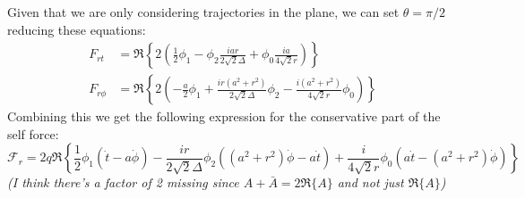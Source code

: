 \documentclass[preprint,showpacs,preprintnumbers,amssymb,superscriptaddress,aps,prd,nofootinbib,11pt]{revtex4-1}
\begin{document}
Given that we are only considering trajectories in the plane, we can set $\theta = \pi/2$ reducing these equations:
\begin{align}
    F_{rt} &=\Re \left\{ 2 \left( \frac{1}{2}\phi_1 - \phi_2  \frac{i a r}{2 \sqrt{2} \Delta} + \phi_0\frac{i a}{4 \sqrt{2} r}\right)\right \}\\
    F_{r\phi} &= \Re\left\{2 \left(-\frac{a}{2} \phi_1 +\frac{i r \left(a^2+r^2\right)}{2 \sqrt{2} \Delta} \phi_2 -\frac{i \left(a^2+r^2\right)}{4 \sqrt{2} r}\phi_0\right)\right\}
\end{align}
Combining this we get the following expression for the conservative part of the self force:
\begin{equation}
    \mathcal{F}_r = 2 q \Re \left\{
    \frac{1}{2} \phi_1 (\dot{t} - a \dot{\phi}) - \frac{ir}{2\sqrt{2}\Delta }\phi_2 ((a^2 +r^2) \dot{\phi} -a\dot{t})+ \frac{i}{4\sqrt{2}r} \phi_0(a \dot{t} - (a^2 +r^2) \dot{\phi})
    \right\} 
\end{equation}
\emph{(I think there's a factor of 2 missing since $A + \bar{A} = 2 \Re\{A\}$ and not just $\Re\{A\}$)}
\end{document}
